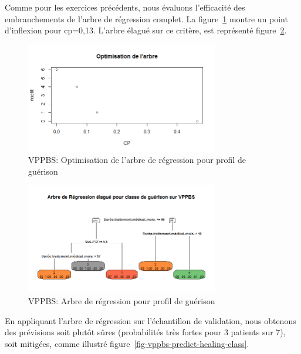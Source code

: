%
%

%

Comme pour les exercices précédents, nous évaluons l'efficacité des embranchements de l'arbre de régression complet. La figure~\ref{fig-vppbs-regtree-optim-healing-class} montre un point d'inflexion pour cp=0,13. L'arbre élagué sur ce critère, est représenté figure~\ref{fig-vppbs-regtree-ipss12}.

\begin{figure}[H]
\centering
\includegraphics[width=0.75\textwidth]{../Fig/VPPBS/vppbs-regtree-optim-healing-class.png}
\caption{VPPBS: Optimisation de l'arbre de régression pour profil de guérison}
\label{fig-vppbs-regtree-optim-healing-class}
\end{figure}

\begin{figure}[H]
\centering
\includegraphics[width=0.75\textwidth]{../Fig/VPPBS/vppbs-regtree-healing-class.png}
\caption{VPPBS: Arbre de régression pour profil de guérison}
\label{fig-vppbs-regtree-ipss12}
\end{figure}

En appliquant l'arbre de régression sur l'échantillon de validation, nous obtenons des prévisions soit plutôt sûres (probabilités très fortes pour 3 patients sur 7), soit mitigées, comme illustré figure~\ref{fig-vppbs-predict-healing-class}.

